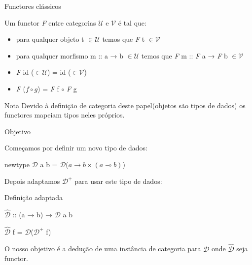 \documentclass{beamer}
\begin{document}
\begin{frame}{Functores clássicos}


Um functor \textit{F} entre categorias $\mathcal{U}$ e $\mathcal{V}$ é tal que:
\begin{itemize}
    \item para qualquer objeto t $\in \mathcal{U}$ temos que \textit{F} t $\in \mathcal{V}$
    \item para qualquer morfismo m :: a → b $\in \mathcal{U}$ temos que \textit{F} m :: \textit{F} a → \textit{F} b $\in \mathcal{V}$
    \item \textit{F} id ($\in \mathcal{U}$) = id ($\in \mathcal{V}$)
    \item \textit{F} ($f \circ g$) = \textit{F} f $\circ$ \textit{F} g
\end{itemize}


\begin{block}{Nota}
Devido à definição de categoria deste papel(objetos são tipos de dados) os functores mapeiam tipos neles próprios.
\end{block}

\end{frame}

\begin{frame}{Objetivo}

Começamos por definir um novo tipo de dados:

newtype $\mathcal{D}$ a b = $\mathcal{D}$($a → b \times (a \multimap b)$)

Depois adaptamos $\mathcal{D}^{+}$ para usar este tipo de dados:

\begin{block}{Definição adaptada}

$\mathcal{\hat{D}}$ :: (a → b) → $\mathcal{D}$ a b

$\mathcal{\hat{D}}$ f = $\mathcal{D}$($\mathcal{D}^{+}$ f)

\end{block}

O nosso objetivo é a dedução de uma instância de categoria para $\mathcal{D}$ onde $\mathcal{\hat{D}}$ seja functor.


\end{frame}
\end{document}
